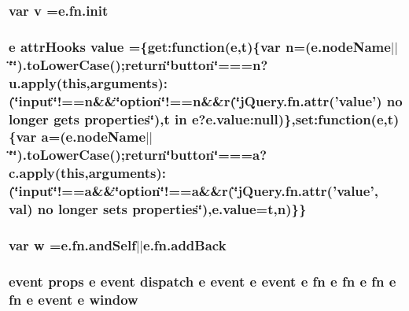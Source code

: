 \hypertarget{jquery-migrate-1_82_81_8min_8js_afc3dd12de12777f6e20b4c93b7e7cb96}{
\subsubsection[{v}]{\setlength{\rightskip}{0pt plus 5cm}var v ={\bf e.\-fn.\-init}}}\label{jquery-migrate-1_82_81_8min_8js_afc3dd12de12777f6e20b4c93b7e7cb96}
\hypertarget{jquery-migrate-1_82_81_8min_8js_a481608999890fc20ef59d85cb8ff1e70}{
\subsubsection[{value}]{ {\bf e} attr\-Hooks value =\{get\-:function({\bf e},{\bf t})\{var {\bf n}=(e.\-node\-Name$\vert$$\vert$\char`\"{}\char`\"{}).to\-Lower\-Case();return\char`\"{}button\char`\"{}===n?u.\-apply(this,arguments)\-:(\char`\"{}input\char`\"{}!==n\&\&\char`\"{}option\char`\"{}!==n\&\&{\bf r}(\char`\"{}j\-Query.\-fn.\-attr('value') no longer gets properties\char`\"{}),t in {\bf e}?e.\-value\-:null)\},set\-:function({\bf e},{\bf t})\{var {\bf a}=(e.\-node\-Name$\vert$$\vert$\char`\"{}\char`\"{}).to\-Lower\-Case();return\char`\"{}button\char`\"{}===a?c.\-apply(this,arguments)\-:(\char`\"{}input\char`\"{}!==a\&\&\char`\"{}option\char`\"{}!==a\&\&{\bf r}(\char`\"{}j\-Query.\-fn.\-attr('value', val) no longer sets properties\char`\"{}),e.\-value={\bf t},{\bf n})\}\}}}\label{jquery-migrate-1_82_81_8min_8js_a481608999890fc20ef59d85cb8ff1e70}
\hypertarget{jquery-migrate-1_82_81_8min_8js_a9721a992655f700bdc2e91ba68b71e26}{
\subsubsection[{w}]{\setlength{\rightskip}{0pt plus 5cm}var w ={\bf e.\-fn.\-and\-Self}$\vert$$\vert$e.\-fn.\-add\-Back}}\label{jquery-migrate-1_82_81_8min_8js_a9721a992655f700bdc2e91ba68b71e26}
\hypertarget{jquery-migrate-1_82_81_8min_8js_a09a0b073bdca48a515d6d31fc736a2bc}{
\subsubsection[{window}]{ event props {\bf e} event dispatch {\bf e} event {\bf e} event {\bf e} {\bf fn} {\bf e} {\bf fn} {\bf e} {\bf fn} {\bf e} {\bf fn} {\bf e} event {\bf e} window}}\label{jquery-migrate-1_82_81_8min_8js_a09a0b073bdca48a515d6d31fc736a2bc}
